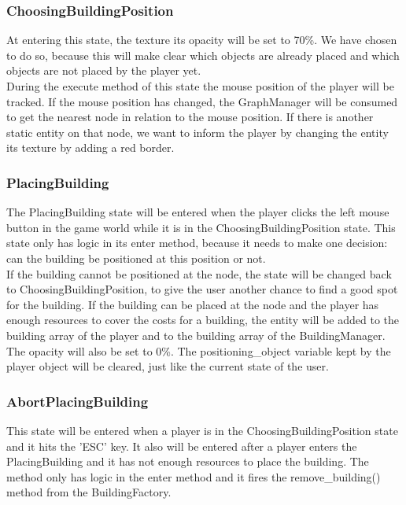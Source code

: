 \subsubsection{ChoosingBuildingPosition}
At entering this state, the texture its opacity will be set to 70\%. We have chosen to do so, because this will make clear which objects are already placed and which objects are not placed by the player yet.\\
During the execute method of this state the mouse position of the player will be tracked. If the mouse position has changed, the GraphManager will be consumed to get the nearest node in relation to the mouse position. If there is another static entity on that node, we want to inform the player by changing the entity its texture by adding a red border.

\subsubsection{PlacingBuilding}
The PlacingBuilding state will be entered when the player clicks the left mouse button in the game world while it is in the ChoosingBuildingPosition state. This state only has logic in its enter method, because it needs to make one decision: can the building be positioned at this position or not.\\
If the building cannot be positioned at the node, the state will be changed back to ChoosingBuildingPosition, to give the user another chance to find a good spot for the building. If the building can be placed at the node and the player has enough resources to cover the costs for a building, the entity will be added to the building array of the player and to the building array of the BuildingManager. The opacity will also be set to 0\%. The positioning\_object variable kept by the player object will be cleared, just like the current state of the user.

\subsubsection{AbortPlacingBuilding} \label{AbortPlacingBuilding}
This state will be entered when a player is in the ChoosingBuildingPosition state and it hits the 'ESC' key. It also will be entered after a player enters the PlacingBuilding and it has not enough resources to place the building. The method only has logic in the enter method and it fires the remove\_building() method from the BuildingFactory. 

